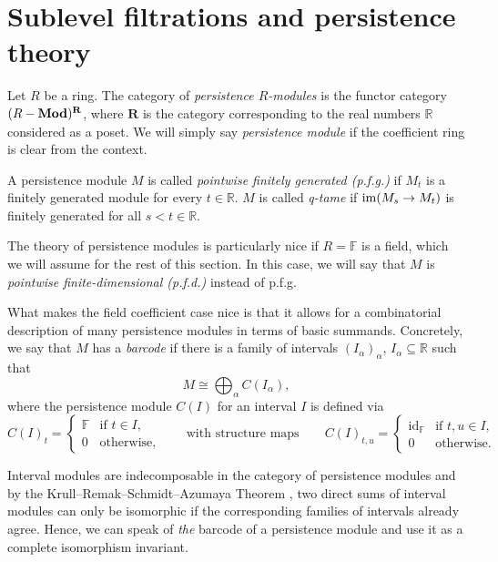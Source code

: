 
\section{Sublevel filtrations and persistence theory} \label{s:persistence}

Let $R$ be a ring. The category of \emph{persistence $R$-modules} is the functor category  $(R-\mathbf{Mod})^{\mathbf{R}}$, where $\mathbf{R}$ is the category corresponding to the real numbers $\mathbb{R}$ considered as a poset. We will simply say \emph{persistence module} if the coefficient ring is clear from the context. 

A persistence module $M$ is called \emph{pointwise finitely generated (p.f.g.)} if $M_{t}$ is a finitely generated module for every $t\in\mathbb{R}$. $M$ is called \emph{q-tame} if $\operatorname{im} (M_{s}\to M_{t})$ is finitely generated for all $s<t\in\mathbb{R}$.

The theory of persistence modules is particularly nice if $R=\mathbb{F}$ is a field, which we will assume for the rest of this section. In this case, we will say that $M$ is \emph{pointwise finite-dimensional (p.f.d.)} instead of p.f.g.

What makes the field coefficient case nice is that it allows for a combinatorial description of many persistence modules in terms of basic summands. Concretely, we say that $M$ has a \emph{barcode} if there is a family of intervals $(I_{\alpha})_{\alpha}$, $I_{\alpha}\subseteq\mathbb{R}$ such that
\[
M\cong\bigoplus_{\alpha} C(I_{\alpha}),
\]
where the persistence module $C(I)$ for an interval $I$ is defined via
\[
C(I)_t=
\begin{cases}
    \mathbb{F} & \text{if } t\in I,\\
    0              & \text{otherwise,}
\end{cases}
\qquad
\text{with structure maps}
\qquad
C(I)_{t,u}=
\begin{cases}
    \operatorname{id}_{\mathbb{F}} & \text{if } t,u\in I,\\
    0              & \text{otherwise.}
\end{cases}
\]

Interval modules are indecomposable in the category of persistence modules and by the Krull--Remak--Schmidt--Azumaya Theorem \cite{MR37832}, two direct sums of interval modules can only be isomorphic if the corresponding families of intervals already agree. Hence, we can speak of \emph{the} barcode of a persistence module and use it as a complete isomorphism invariant.

